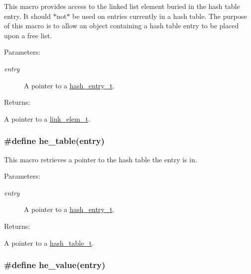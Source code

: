 This macro provides access to the linked list element buried in the hash table entry. It should $\ast$not$\ast$ be used on entries currently in a hash table. The purpose of this macro is to allow an object containing a hash table entry to be placed upon a free list.\begin{Desc}
\item[Parameters: ]\par
\begin{description}
\item[{\em 
entry}]A pointer to a \hyperlink{group__dbprim__hash_a1}{hash\_\-entry\_\-t}.\end{description}
\end{Desc}
\begin{Desc}
\item[Returns: ]\par
A pointer to a \hyperlink{group__dbprim__link_a1}{link\_\-elem\_\-t}. \end{Desc}
\hypertarget{group__dbprim__hash_a33}{
\subsubsection[he\_\-table]{\setlength{\rightskip}{0pt plus 5cm}\#define he\_\-table(entry)}}
\label{group__dbprim__hash_a33}


This macro retrieves a pointer to the hash table the entry is in.\begin{Desc}
\item[Parameters: ]\par
\begin{description}
\item[{\em 
entry}]A pointer to a \hyperlink{group__dbprim__hash_a1}{hash\_\-entry\_\-t}.\end{description}
\end{Desc}
\begin{Desc}
\item[Returns: ]\par
A pointer to a \hyperlink{group__dbprim__hash_a0}{hash\_\-table\_\-t}. \end{Desc}
\hypertarget{group__dbprim__hash_a36}{
\subsubsection[he\_\-value]{\setlength{\rightskip}{0pt plus 5cm}\#define he\_\-value(entry)}}
\label{group__dbprim__hash_a36}


